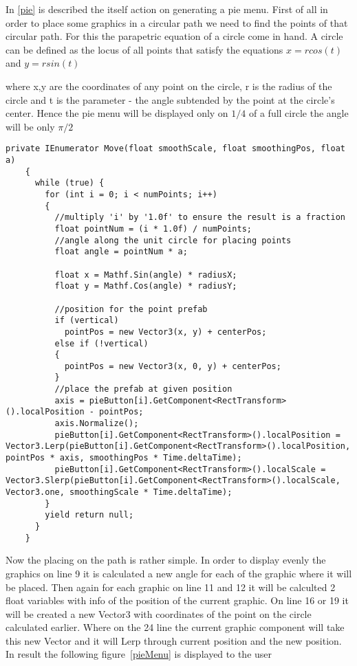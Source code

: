 { In \autoref{pie} is described the itself action on generating a pie menu. First of all in order to place some graphics in a circular path we need to find the points of that circular path. For this the parapetric equation of a circle come in hand. 
 A circle can be defined as the locus of all points that satisfy the equations
 $x = r cos(t)$ and    $y = r sin(t)$
 
 where x,y are the coordinates of any point on the circle, r is the radius of the circle and 
 t is the parameter - the angle subtended by the point at the circle's center. Hence the pie menu will be displayed only on $1/4$ of a full circle the angle will be only $\pi/2$
  \begin{lstlisting}[caption={Creation of a Pie Menu},label={createController}]
   private IEnumerator Move(float smoothScale, float smoothingPos, float a)
    {
      while (true) {
        for (int i = 0; i < numPoints; i++)
        {
          //multiply 'i' by '1.0f' to ensure the result is a fraction
          float pointNum = (i * 1.0f) / numPoints;
          //angle along the unit circle for placing points
          float angle = pointNum * a;
  
          float x = Mathf.Sin(angle) * radiusX;
          float y = Mathf.Cos(angle) * radiusY;
  
          //position for the point prefab
          if (vertical)
            pointPos = new Vector3(x, y) + centerPos;
          else if (!vertical)
          {
            pointPos = new Vector3(x, 0, y) + centerPos;
          }
          //place the prefab at given position
          axis = pieButton[i].GetComponent<RectTransform>().localPosition - pointPos;
          axis.Normalize();
          pieButton[i].GetComponent<RectTransform>().localPosition = Vector3.Lerp(pieButton[i].GetComponent<RectTransform>().localPosition, pointPos * axis, smoothingPos * Time.deltaTime);
          pieButton[i].GetComponent<RectTransform>().localScale = Vector3.Slerp(pieButton[i].GetComponent<RectTransform>().localScale, Vector3.one, smoothingScale * Time.deltaTime);
        }
        yield return null;
      }
    }
  \end{lstlisting}
Now the placing on the path is rather simple. In order to display evenly the graphics on line 9 it is calculated a new angle for each of the graphic where it will be placed. Then again for each graphic on line 11 and 12 it will be calculted 2 float variables with info of the position of the current graphic. On line 16 or 19 it will be created a new Vector3 with coordinates of the point on the circle calculated earlier. Where on the 24 line the current graphic component will take this new Vector and it will Lerp through current position and the new position. In result the following  \mbox{figure \ref{pieMenu}} is displayed to the user 

}
